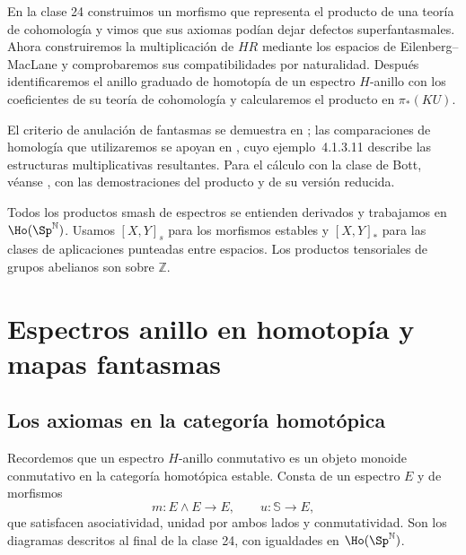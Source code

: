 
En la clase 24 construimos un morfismo que representa el producto de una teoría de cohomología y vimos que sus axiomas podían dejar defectos superfantasmales. Ahora construiremos la multiplicación de $HR$ mediante los espacios de Eilenberg--MacLane y comprobaremos sus compatibilidades por naturalidad. Después identificaremos el anillo graduado de homotopía de un espectro $H$-anillo con los coeficientes de su teoría de cohomología y calcularemos el producto en $\pi_*(KU)$.

El criterio de anulación de fantasmas se demuestra en \cite[lección~17, definición~8 y proposición~10]{lurie2010chromatic}; las comparaciones de homología que utilizaremos se apoyan en \cite[teoremas~1.3.1.11, 1.3.3.7 y 2.6.5.7]{malkiewich}, cuyo ejemplo~4.1.3.11 describe las estructuras multiplicativas resultantes. Para el cálculo con la clase de Bott, véanse \cite[teorema~2.2, corolario~2.3, teorema~2.11 y corolario~2.12]{hatcher2017vbkt}, con las demostraciones del producto y de su versión reducida.

Todos los productos smash de espectros se entienden derivados y trabajamos en $\Ho(\Sp^{\mathbb N})$. Usamos $[X,Y]_s$ para los morfismos estables y $[X,Y]_* $ para las clases de aplicaciones punteadas entre espacios. Los productos tensoriales de grupos abelianos son sobre $\mathbb Z$.

\section{Espectros anillo en homotopía y mapas fantasmas}

\subsection{Los axiomas en la categoría homotópica}
Recordemos que un espectro $H$-anillo conmutativo es un objeto monoide conmutativo en la categoría homotópica estable. Consta de un espectro $E$ y de morfismos
\[
m\colon E\wedge E\longrightarrow E,
\qquad u\colon\mathbb S\longrightarrow E,
\]
que satisfacen asociatividad, unidad por ambos lados y conmutatividad. Son los diagramas descritos al final de la clase 24, con igualdades en $\Ho(\Sp^{\mathbb N})$.

